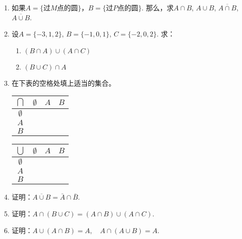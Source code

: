 \begin{ex}
\begin{enumerate}
  \item 如果$A=\{\text{过$M$点的圆}\}$，$B=\{\text{过$P$点的圆}\}$. 
那么，求$A\cap B$, $A\cup B$, $\overline{A\cap B}$, $\overline{A\cup B}$.
\item 设$A=\{-3, 1, 2\}$, $B=\{-1, 0, 1\}$, $C=\{-2, 0, 2\}$. 求：
\begin{multicols}{2}
\begin{enumerate}
  \item $(B\cap A)\cup (A\cap C)$
  \item $(B\cup C) \cap A$
\end{enumerate}
\end{multicols}

\item 在下表的空格处填上适当的集合。
\begin{center}
\begin{tabular}{c|ccc}
  \hline
  $\bigcap $ & $\emptyset$ &$A$&$B$ \\
  \hline
  $\emptyset$ \\
$A$\\
$B$\\
\hline
\end{tabular}\qquad 
\begin{tabular}{c|ccc}
  \hline
  $\bigcup $ & $\emptyset$ &$A$&$B$ \\
  \hline
  $\emptyset$ \\
$A$\\
$B$\\
\hline
\end{tabular}
\end{center}


\item 证明：$\overline{A\cup B}=\bar A\cap \bar B$. 
\item 证明：$A\cap (B\cup C)= (A\cap B)\cup  (A\cap C)$.
\item 证明：$A\cup (A\cap B)=A,\quad A\cap  (A\cup B) =A$.
\end{enumerate}
  
\end{ex}

